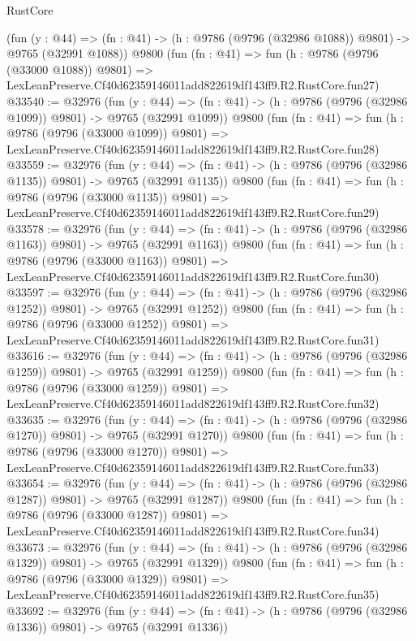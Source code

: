 \begin{lexlean}{RustCore}
\begin{coremodule}
    (fun (y : @44) =>
    (fn : @41) -> (h : @9786 (@9796 (@32986 @1088)) @9801) -> @9765 (@32991 @1088))
    @9800
    (fun (fn : @41) =>
    fun (h : @9786 (@9796 (@33000 @1088)) @9801) =>
    LexLeanPreserve.Cf40d62359146011add822619df143ff9.R2.RustCore.fun27)
@33540 := @32976
    (fun (y : @44) =>
    (fn : @41) -> (h : @9786 (@9796 (@32986 @1099)) @9801) -> @9765 (@32991 @1099))
    @9800
    (fun (fn : @41) =>
    fun (h : @9786 (@9796 (@33000 @1099)) @9801) =>
    LexLeanPreserve.Cf40d62359146011add822619df143ff9.R2.RustCore.fun28)
@33559 := @32976
    (fun (y : @44) =>
    (fn : @41) -> (h : @9786 (@9796 (@32986 @1135)) @9801) -> @9765 (@32991 @1135))
    @9800
    (fun (fn : @41) =>
    fun (h : @9786 (@9796 (@33000 @1135)) @9801) =>
    LexLeanPreserve.Cf40d62359146011add822619df143ff9.R2.RustCore.fun29)
@33578 := @32976
    (fun (y : @44) =>
    (fn : @41) -> (h : @9786 (@9796 (@32986 @1163)) @9801) -> @9765 (@32991 @1163))
    @9800
    (fun (fn : @41) =>
    fun (h : @9786 (@9796 (@33000 @1163)) @9801) =>
    LexLeanPreserve.Cf40d62359146011add822619df143ff9.R2.RustCore.fun30)
@33597 := @32976
    (fun (y : @44) =>
    (fn : @41) -> (h : @9786 (@9796 (@32986 @1252)) @9801) -> @9765 (@32991 @1252))
    @9800
    (fun (fn : @41) =>
    fun (h : @9786 (@9796 (@33000 @1252)) @9801) =>
    LexLeanPreserve.Cf40d62359146011add822619df143ff9.R2.RustCore.fun31)
@33616 := @32976
    (fun (y : @44) =>
    (fn : @41) -> (h : @9786 (@9796 (@32986 @1259)) @9801) -> @9765 (@32991 @1259))
    @9800
    (fun (fn : @41) =>
    fun (h : @9786 (@9796 (@33000 @1259)) @9801) =>
    LexLeanPreserve.Cf40d62359146011add822619df143ff9.R2.RustCore.fun32)
@33635 := @32976
    (fun (y : @44) =>
    (fn : @41) -> (h : @9786 (@9796 (@32986 @1270)) @9801) -> @9765 (@32991 @1270))
    @9800
    (fun (fn : @41) =>
    fun (h : @9786 (@9796 (@33000 @1270)) @9801) =>
    LexLeanPreserve.Cf40d62359146011add822619df143ff9.R2.RustCore.fun33)
@33654 := @32976
    (fun (y : @44) =>
    (fn : @41) -> (h : @9786 (@9796 (@32986 @1287)) @9801) -> @9765 (@32991 @1287))
    @9800
    (fun (fn : @41) =>
    fun (h : @9786 (@9796 (@33000 @1287)) @9801) =>
    LexLeanPreserve.Cf40d62359146011add822619df143ff9.R2.RustCore.fun34)
@33673 := @32976
    (fun (y : @44) =>
    (fn : @41) -> (h : @9786 (@9796 (@32986 @1329)) @9801) -> @9765 (@32991 @1329))
    @9800
    (fun (fn : @41) =>
    fun (h : @9786 (@9796 (@33000 @1329)) @9801) =>
    LexLeanPreserve.Cf40d62359146011add822619df143ff9.R2.RustCore.fun35)
@33692 := @32976
    (fun (y : @44) =>
    (fn : @41) -> (h : @9786 (@9796 (@32986 @1336)) @9801) -> @9765 (@32991 @1336))

\end{coremodule}
\end{lexlean}
